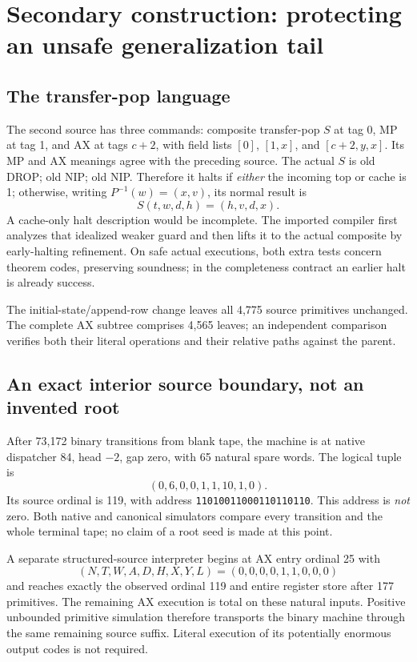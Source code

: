 \section{Secondary construction: protecting an unsafe generalization tail}
\subsection{The transfer-pop language}
The second source has three commands: composite transfer-pop $S$ at tag 0, MP at tag 1, and AX at tags $c+2$, with field lists $[0]$, $[1,x]$, and $[c+2,y,x]$. Its MP and AX meanings agree with the preceding source. The actual $S$ is old DROP; old NIP; old NIP. Therefore it halts if \emph{either} the incoming top or cache is 1; otherwise, writing $P^{-1}(w)=(x,v)$, its normal result is
\[
                             S(t,w,d,h)=(h,v,d,x).
\]
A cache-only halt description would be incomplete. The imported compiler first analyzes that idealized weaker guard and then lifts it to the actual composite by early-halting refinement. On safe actual executions, both extra tests concern theorem codes, preserving soundness; in the completeness contract an earlier halt is already success.

The initial-state/append-row change leaves all 4,775 source primitives unchanged. The complete AX subtree comprises 4,565 leaves; an independent comparison verifies both their literal operations and their relative paths against the parent.

\subsection{An exact interior source boundary, not an invented root}
After 73,172 binary transitions from blank tape, the machine is at native dispatcher 84, head $-2$, gap zero, with 65 natural spare words. The logical tuple is
\[
                        (0,6,0,0,1,1,10,1,0).
\]
Its source ordinal is 119, with address \texttt{11010011000110110110}. This address is \emph{not} zero. Both native and canonical simulators compare every transition and the whole terminal tape; no claim of a root seed is made at this point.

A separate structured-source interpreter begins at AX entry ordinal 25 with
\[
                         (N,T,W,A,D,H,X,Y,L)=(0,0,0,0,1,1,0,0,0)
\]
and reaches exactly the observed ordinal 119 and entire register store after 177 primitives. The remaining AX execution is total on these natural inputs. Positive unbounded primitive simulation therefore transports the binary machine through the same remaining source suffix. Literal execution of its potentially enormous output codes is not required.

